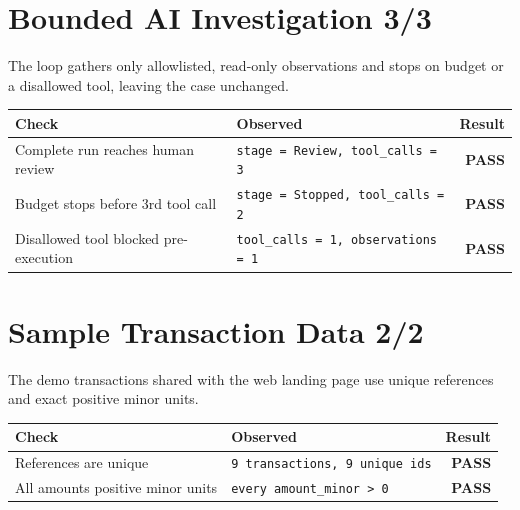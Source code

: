 \documentclass[11pt,a4paper]{article}
\newcommand{\pass}{\textcolor{PassGreen}{\textbf{PASS}}}
\begin{document}
\section*{Bounded AI Investigation \hfill \normalsize\textcolor{ADGBlue}{3/3}}
\noindent The loop gathers only allowlisted, read-only observations and stops on budget or a disallowed tool, leaving the case unchanged.\par\vspace{0.4em}
\renewcommand{\arraystretch}{1.25}
\begin{longtable}{@{}p{}p{}r@{}}
\toprule
\textbf{Check} & \textbf{Observed} & \textbf{Result} \\
\midrule
\endhead
Complete run reaches human review & \texttt{\small stage = Review, tool\_calls = 3} & \pass \\
Budget stops before 3rd tool call & \texttt{\small stage = Stopped, tool\_calls = 2} & \pass \\
Disallowed tool blocked pre-execution & \texttt{\small tool\_calls = 1, observations = 1} & \pass \\
\bottomrule
\end{longtable}

\section*{Sample Transaction Data \hfill \normalsize\textcolor{ADGBlue}{2/2}}
\noindent The demo transactions shared with the web landing page use unique references and exact positive minor units.\par\vspace{0.4em}
\renewcommand{\arraystretch}{1.25}
\begin{longtable}{@{}p{}p{}r@{}}
\toprule
\textbf{Check} & \textbf{Observed} & \textbf{Result} \\
\midrule
\endhead
References are unique & \texttt{\small 9 transactions, 9 unique ids} & \pass \\
All amounts positive minor units & \texttt{\small every amount\_minor \textgreater{} 0} & \pass \\
\bottomrule
\end{longtable}
\end{document}
